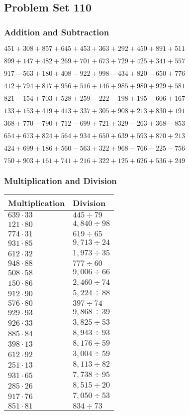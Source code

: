 \hypertarget{problem-set-110}{%
\subsection{Problem Set 110}\label{problem-set-110}}

\hypertarget{addition-and-subtraction}{%
\subsubsection{Addition and
Subtraction}\label{addition-and-subtraction}}

\(451 +308 +857 +645 +453 +363 +292 +450 +891 +511\)

\(899 +147 +482 +269 +701 +673 +729 +425 +341 +557\)

\(917 - 563 +180 +408 - 922 +998 - 434 +820 - 650 +776\)

\(412 +794 +817 +956 +516 +146 +985 +980 +929 +581\)

\(821 - 154 +703 +528 +259 - 222 - 198 +195 - 606 +167\)

\(133 +153 +419 +413 +337 +305 +908 +213 +830 +191\)

\(368 +770 - 790 +712 - 699 +721 +329 - 263 +368 - 853\)

\(654 +673 +824 +564 +934 +650 +639 +593 +870 +213\)

\(424 +699 +186 +560 - 563 +322 +968 - 766 - 225 - 756\)

\(750 +903 +161 +741 +216 +322 +125 +626 +536 +249\)

\hypertarget{multiplication-and-division}{%
\subsubsection{Multiplication and
Division}\label{multiplication-and-division}}

\begin{longtable}[]{@{}ll@{}}
\toprule
Multiplication & Division\tabularnewline
\midrule
\endhead
\(639 \cdot 33\) & \(445÷79\)\tabularnewline
\(121 \cdot 80\) & \(4,840÷98\)\tabularnewline
\(774 \cdot 31\) & \(619÷65\)\tabularnewline
\(931 \cdot 85\) & \(9,713÷24\)\tabularnewline
\(612 \cdot 32\) & \(1,973÷35\)\tabularnewline
\(948 \cdot 88\) & \(777÷60\)\tabularnewline
\(508 \cdot 58\) & \(9,006÷66\)\tabularnewline
\(150 \cdot 86\) & \(2,460÷74\)\tabularnewline
\(912 \cdot 90\) & \(5,224÷88\)\tabularnewline
\(576 \cdot 80\) & \(397 ÷ 74\)\tabularnewline
\(929 \cdot 93\) & \(9,868÷39\)\tabularnewline
\(926 \cdot 33\) & \(3,825÷53\)\tabularnewline
\(885 \cdot 84\) & \(8,943÷93\)\tabularnewline
\(398 \cdot 13\) & \(8,176÷59\)\tabularnewline
\(612 \cdot 92\) & \(3,004÷59\)\tabularnewline
\(251 \cdot 13\) & \(8,113÷82\)\tabularnewline
\(931 \cdot 65\) & \(7,738÷95\)\tabularnewline
\(285 \cdot 26\) & \(8,515÷20\)\tabularnewline
\(917 \cdot 76\) & \(7,050÷53\)\tabularnewline
\(851 \cdot 81\) & \(834÷73\)\tabularnewline
\bottomrule
\end{longtable}
